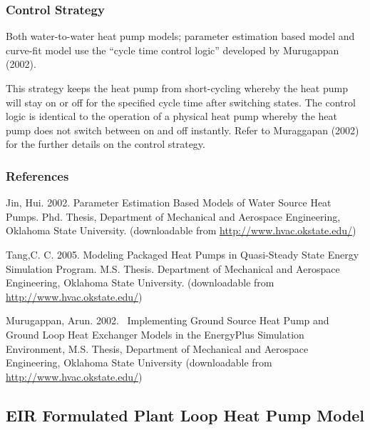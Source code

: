 \subsubsection{Control Strategy}\label{control-strategy}

Both water-to-water heat pump models; parameter estimation based model and curve-fit model use the ``cycle time control logic'' developed by Murugappan (2002).

This strategy keeps the heat pump from short-cycling whereby the heat pump will stay on or off for the specified cycle time after switching states. The control logic is identical to the operation of a physical heat pump whereby the heat pump does not switch between on and off instantly. Refer to Muraggapan (2002) for the further details on the control strategy.

\subsubsection{References}\label{references-1}

Jin, Hui. 2002. Parameter Estimation Based Models of Water Source Heat Pumps. Phd. Thesis, Department of Mechanical and Aerospace Engineering, Oklahoma State University. (downloadable from \href{http://www.hvac.okstate.edu}{http://www.hvac.okstate.edu/})

Tang,C. C. 2005. Modeling Packaged Heat Pumps in Quasi-Steady State Energy Simulation Program. M.S. Thesis. Department of Mechanical and Aerospace Engineering, Oklahoma State University. (downloadable from \href{http://www.hvac.okstate.edu}{http://www.hvac.okstate.edu/})

Murugappan, Arun. 2002.~ Implementing Ground Source Heat Pump and Ground Loop Heat Exchanger Models in the EnergyPlus Simulation Environment, M.S. Thesis, Department of Mechanical and Aerospace Engineering, Oklahoma State University (downloadable from \href{http://www.hvac.okstate.edu}{http://www.hvac.okstate.edu/})

\subsection{EIR Formulated Plant Loop Heat Pump Model}\label{eir-plant-loop-heat-pump-model}

